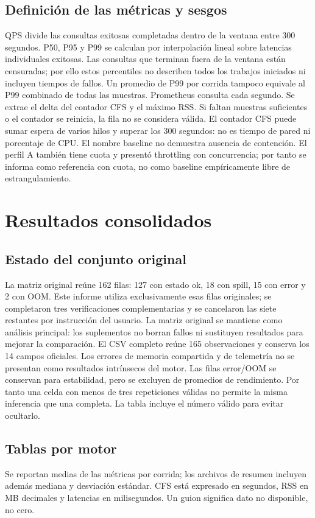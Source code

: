 \documentclass[11pt,letterpaper]{article}
\begin{document}
\subsection{Definición de las métricas y sesgos}
QPS divide las consultas exitosas completadas dentro de la ventana entre 300 segundos. P50, P95 y P99 se calculan por interpolación lineal sobre latencias individuales exitosas. Las consultas que terminan fuera de la ventana están censuradas; por ello estos percentiles no describen todos los trabajos iniciados ni incluyen tiempos de fallos. Un promedio de P99 por corrida tampoco equivale al P99 combinado de todas las muestras.
Prometheus consulta cada segundo. Se extrae el delta del contador CFS y el máximo RSS. Si faltan muestras suficientes o el contador se reinicia, la fila no se considera válida. El contador CFS puede sumar espera de varios hilos y superar los 300 segundos: no es tiempo de pared ni porcentaje de CPU.
El nombre baseline no demuestra ausencia de contención. El perfil A también tiene cuota y presentó throttling con concurrencia; por tanto se informa como referencia con cuota, no como baseline empíricamente libre de estrangulamiento.
\section{Resultados consolidados}
\subsection{Estado del conjunto original}
La matriz original reúne 162 filas: 127 con estado ok, 18 con spill, 15 con error y 2 con OOM. Este informe utiliza exclusivamente esas filas originales; se completaron tres verificaciones complementarias y se cancelaron las siete restantes por instrucción del usuario. La matriz original se mantiene como análisis principal: los suplementos no borran fallos ni sustituyen resultados para mejorar la comparación. El CSV completo reúne 165 observaciones y conserva los 14 campos oficiales.
Los errores de memoria compartida y de telemetría no se presentan como resultados intrínsecos del motor. Las filas error/OOM se conservan para estabilidad, pero se excluyen de promedios de rendimiento. Por tanto una celda con menos de tres repeticiones válidas no permite la misma inferencia que una completa. La tabla incluye el número válido para evitar ocultarlo.
\subsection{Tablas por motor}
Se reportan medias de las métricas por corrida; los archivos de resumen incluyen además mediana y desviación estándar. CFS está expresado en segundos, RSS en MB decimales y latencias en milisegundos. Un guion significa dato no disponible, no cero.
\end{document}

